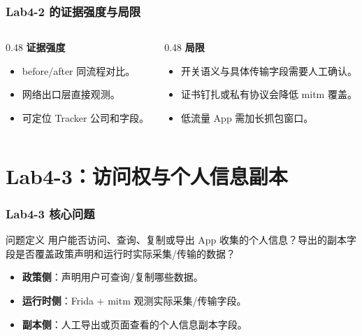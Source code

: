 \documentclass[AutoFakeBold,AutoFakeSlant]{beamer}
\begin{document}
\begin{frame}
    \frametitle{Lab4-2 的证据强度与局限}
    \small
    \begin{columns}[T]
        \begin{column}{0.48\textwidth}
            \textbf{证据强度}
            \begin{itemize}
                \item before/after 同流程对比。
                \item 网络出口层直接观测。
                \item 可定位 Tracker 公司和字段。
            \end{itemize}
        \end{column}
        \begin{column}{0.48\textwidth}
            \textbf{局限}
            \begin{itemize}
                \item 开关语义与具体传输字段需要人工确认。
                \item 证书钉扎或私有协议会降低 mitm 覆盖。
                \item 低流量 App 需加长抓包窗口。
            \end{itemize}
        \end{column}
    \end{columns}
\end{frame}

\section{Lab4-3：访问权与个人信息副本}

\begin{frame}
    \frametitle{Lab4-3 核心问题}
    \small
    \begin{block}{问题定义}
        用户能否访问、查询、复制或导出 App 收集的个人信息？导出的副本字段是否覆盖政策声明和运行时实际采集/传输的数据？
    \end{block}
    \begin{itemize}
        \item \textbf{政策侧}：声明用户可查询/复制哪些数据。
        \item \textbf{运行时侧}：Frida + mitm 观测实际采集/传输字段。
        \item \textbf{副本侧}：人工导出或页面查看的个人信息副本字段。
    \end{itemize}
\end{frame}
\end{document}
